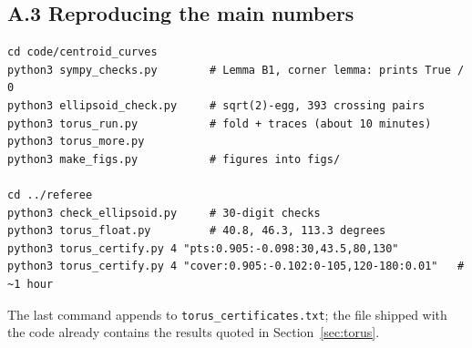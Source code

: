 \documentclass[11pt]{article}
\theoremstyle{plain}
\theoremstyle{definition}
\theoremstyle{remark}
\begin{document}
\subsection*{A.3 Reproducing the main numbers}
\begin{lstlisting}
cd code/centroid_curves
python3 sympy_checks.py        # Lemma B1, corner lemma: prints True / 0
python3 ellipsoid_check.py     # sqrt(2)-egg, 393 crossing pairs
python3 torus_run.py           # fold + traces (about 10 minutes)
python3 torus_more.py
python3 make_figs.py           # figures into figs/

cd ../referee
python3 check_ellipsoid.py     # 30-digit checks
python3 torus_float.py         # 40.8, 46.3, 113.3 degrees
python3 torus_certify.py 4 "pts:0.905:-0.098:30,43.5,80,130"
python3 torus_certify.py 4 "cover:0.905:-0.102:0-105,120-180:0.01"   # ~1 hour
\end{lstlisting}
The last command appends to \texttt{torus\_certificates.txt}; the file shipped with the code already contains the results quoted in Section~\ref{sec:torus}.
\end{document}
